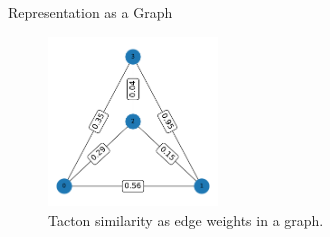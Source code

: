 \begin{frame}{Representation as a Graph}

\begin{figure}[!htb]
\centering
\includegraphics[width=0.4\textwidth]{Images/helper_graph.pdf}
\caption{Tacton similarity as edge weights in a graph.}
\label{fig:helper_graph}
\end{figure}
    
\end{frame}
